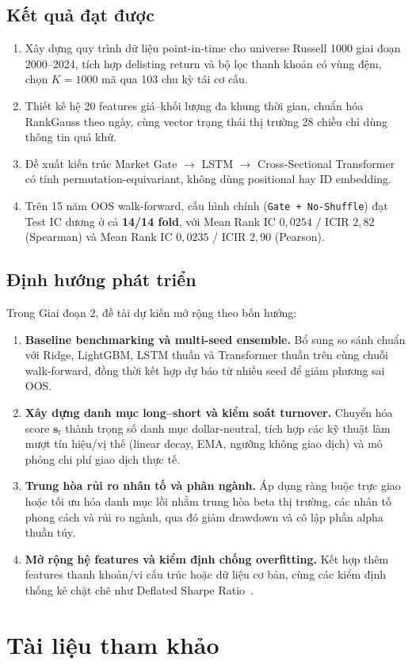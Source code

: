 \documentclass[a4paper,12pt]{article}
\begin{document}
\subsection{Kết quả đạt được}
\begin{enumerate}
    \item Xây dựng quy trình dữ liệu point-in-time cho universe Russell 1000 giai đoạn 2000--2024, tích hợp delisting return và bộ lọc thanh khoản có vùng đệm, chọn $K=1000$ mã qua 103 chu kỳ tái cơ cấu.
    \item Thiết kế hệ 20 features giá--khối lượng đa khung thời gian, chuẩn hóa RankGauss theo ngày, cùng vector trạng thái thị trường 28 chiều chỉ dùng thông tin quá khứ.
    \item Đề xuất kiến trúc Market Gate $\to$ LSTM $\to$ Cross-Sectional Transformer có tính permutation-equivariant, không dùng positional hay ID embedding.
    \item Trên 15 năm OOS walk-forward, cấu hình chính (\texttt{Gate + No-Shuffle}) đạt Test IC dương ở cả \textbf{14/14 fold}, với Mean Rank IC $0{,}0254$ / ICIR $2{,}82$ (Spearman) và Mean Rank IC $0{,}0235$ / ICIR $2{,}90$ (Pearson).
\end{enumerate}

\subsection{Định hướng phát triển}
Trong Giai đoạn 2, đề tài dự kiến mở rộng theo bốn hướng:
\begin{enumerate}
    \item \textbf{Baseline benchmarking và multi-seed ensemble.} Bổ sung so sánh chuẩn với Ridge, LightGBM, LSTM thuần và Transformer thuần trên cùng chuỗi walk-forward, đồng thời kết hợp dự báo từ nhiều seed để giảm phương sai OOS.
    \item \textbf{Xây dựng danh mục long--short và kiểm soát turnover.} Chuyển hóa score $\mathbf{s}_t$ thành trọng số danh mục dollar-neutral, tích hợp các kỹ thuật làm mượt tín hiệu/vị thế (linear decay, EMA, ngưỡng không giao dịch) và mô phỏng chi phí giao dịch thực tế.
    \item \textbf{Trung hòa rủi ro nhân tố và phân ngành.} Áp dụng ràng buộc trực giao hoặc tối ưu hóa danh mục lồi nhằm trung hòa beta thị trường, các nhân tố phong cách và rủi ro ngành, qua đó giảm drawdown và cô lập phần alpha thuần túy.
    \item \textbf{Mở rộng hệ features và kiểm định chống overfitting.} Kết hợp thêm features thanh khoản/vi cấu trúc hoặc dữ liệu cơ bản, cùng các kiểm định thống kê chặt chẽ như Deflated Sharpe Ratio~\cite{BaileyLopezDePrado2014}.
\end{enumerate}


\newpage
\section*{Tài liệu tham khảo}
\printbibliography[heading=none]
\end{document}
